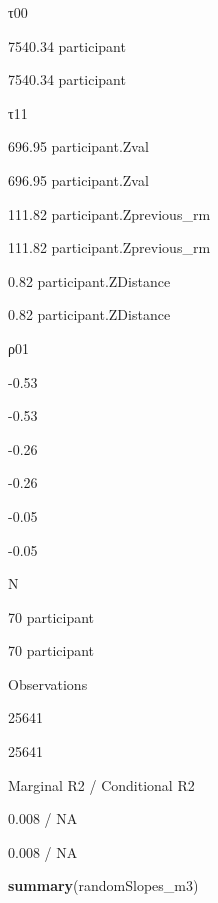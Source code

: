 \documentclass[
]{article}
\newenvironment{Shaded}{\begin{snugshade}}{\end{snugshade}}
\newcommand{\KeywordTok}[1]{\textcolor[rgb]{0.13,0.29,0.53}{\textbf{#1}}}
\newcommand{\NormalTok}[1]{#1}
\begin{document}
τ00

7540.34 participant

7540.34 participant

τ11

696.95 participant.Zval

696.95 participant.Zval

111.82 participant.Zprevious\_rm

111.82 participant.Zprevious\_rm

0.82 participant.ZDistance

0.82 participant.ZDistance

ρ01

-0.53

-0.53

-0.26

-0.26

-0.05

-0.05

N

70 participant

70 participant

Observations

25641

25641

Marginal R2 / Conditional R2

0.008 / NA

0.008 / NA

\begin{Shaded}
\begin{Highlighting}[]
\KeywordTok{summary}\NormalTok{(randomSlopes_m3)}
\end{Highlighting}
\end{Shaded}
\end{document}
